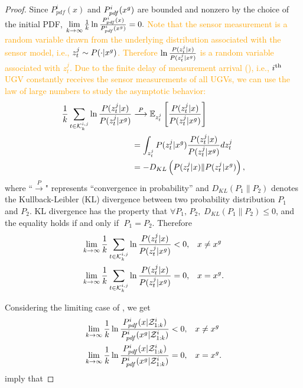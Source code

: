 \begin{proof}
		Since $P^i_{pdf}(x)$ and $P^i_{pdf}(x^g)$ are bounded and nonzero by the choice of the initial PDF, $\lim\limits_{k\rightarrow \infty}\frac{1}{k}\ln\frac{P^i_{pdf}(x)}{P^i_{pdf}(x^g)}= 0.$
		\textcolor{orange}{Note that the sensor measurement is a random variable drawn from the underlying distribution associated with the sensor model, i.e., $z^j_t\sim P(\cdot|x^g)$.
		Therefore $\ln\frac{P(z^j_t|x)}{P(z^j_t|x^g)}$ is a random variable associated with $z^j_t$.
		Due to the finite delay of measurement arrival (), i.e., $i^\text{th}$ UGV constantly receives the sensor measurements of all UGVs, we can use the law of large numbers to study the asymptotic behavior:}
		\small\begin{subequations}\label{eqn:cmp_lim2}
			\begin{align}
			\frac{1}{k}\sum\limits_{t\in\mathcal{K}^{i,j}_{k}}\ln\frac{P(z^j_t|x)}{P(z^j_t|x^g)}&\overset{P}{\longrightarrow}\mathbb{E}_{z^j_t} \left[\frac{P(z^j_t|x)}{P(z^j_t|x^g)}\right]\\
			&=\int_{z^j_t} P(z^j_t|x^g)\frac{P(z^j_t|x)}{P(z^j_t|x^g)} dz^j_t\\
			&=-D_{KL}\left(P(z^j_t|x)\|P(z^j_t|x^g)\right),
			\end{align}
		\end{subequations}\normalsize		
		where ``$\overset{P}{\longrightarrow}$" represents ``convergence in probability'' and $D_{KL}(P_1\|P_2)$ denotes the Kullback-Leibler (KL) divergence between two probability distribution $P_1$ and $P_2$.
		KL divergence has the property that $\forall P_1,\,P_2, \; D_{KL}(P_1\|P_2)\leq 0$, and the equality holds if and only if $\; P_1=P_2.$ Therefore
		\small\begin{align*}
		\lim\limits_{k\rightarrow \infty}\frac{1}{k}\sum\limits_{t\in\mathcal{K}^{i,j}_{k}}\ln\frac{P(z^j_t|x)}{P(z^j_t|x^g)}<0,&\quad x\neq x^g\\
		\lim\limits_{k\rightarrow \infty}\frac{1}{k}\sum\limits_{t\in\mathcal{K}^{i,j}_{k}}\ln\frac{P(z^j_t|x)}{P(z^j_t|x^g)}=0,&\quad x= x^g.
		\end{align*}\normalsize
		
		Considering the limiting case of , we get
		\small\begin{align}
		\lim\limits_{k\rightarrow \infty}\frac{1}{k}\ln\frac{P^i_{pdf}(x|\mathcal{Z}^i_{1:k})}{P^i_{pdf}(x^g|\mathcal{Z}^i_{1:k})}<0,&\quad x\neq x^g\label{subeqn:limit1}\\
		\lim\limits_{k\rightarrow \infty}\frac{1}{k}\ln\frac{P^i_{pdf}(x|\mathcal{Z}^i_{1:k})}{P^i_{pdf}(x^g|\mathcal{Z}^i_{1:k})}=0,&\quad x= x^g\label{subeqn:limit2}.
		\end{align}\normalsize
		 imply that
		

\end{proof}
